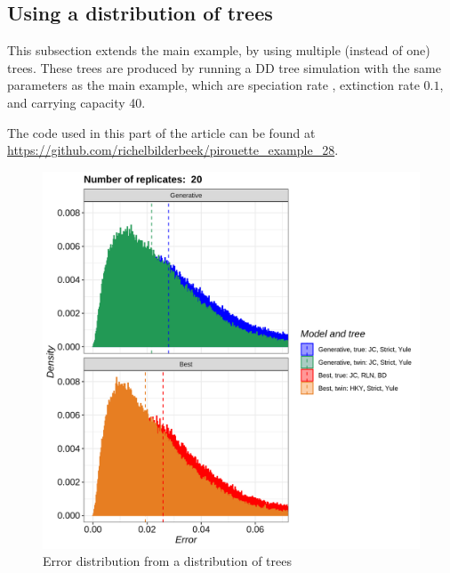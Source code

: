 



\subsection{Using a distribution of trees}
\label{subsec:distribution}


This subsection extends the main example, by using multiple (instead of
one) trees. These trees are produced by running a DD tree simulation
with the same parameters as the main example, which are
speciation rate , extinction rate $0.1$, and carrying
capacity 40. 

The code used in this part of the article can be found at 
\url{https://github.com/richelbilderbeek/pirouette_example_28}.

\begin{figure}[H]
  \includegraphics[width=\textwidth]{pirouette_example_28/errors.png}
  \caption{Error distribution from a distribution of trees}
\end{figure}

